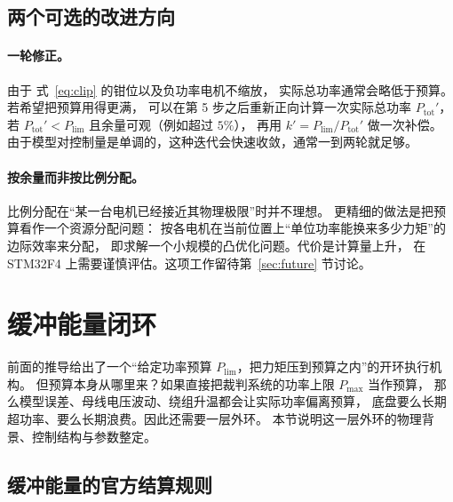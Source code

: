 \documentclass[cn,blue,11pt,device=normal]{elegantnote}
\newcommand{\Plim}{P_{\mathrm{lim}}{}}
\newcommand{\Pmax}{P_{\max}{}}
\newcommand{\fref}[1]{式~\eqref{#1}}
\begin{document}
\subsection{两个可选的改进方向}

\paragraph{一轮修正。}
由于 \fref{eq:clip} 的钳位以及负功率电机不缩放，
实际总功率通常会略低于预算。若希望把预算用得更满，
可以在第 5 步之后重新正向计算一次实际总功率 $P_{\mathrm{tot}}'$，
若 $P_{\mathrm{tot}}' < \Plim$ 且余量可观（例如超过 $5\%$），
再用 $k' = \Plim/P_{\mathrm{tot}}'$ 做一次补偿。
由于模型对控制量是单调的，这种迭代会快速收敛，通常一到两轮就足够。

\paragraph{按余量而非按比例分配。}
比例分配在“某一台电机已经接近其物理极限”时并不理想。
更精细的做法是把预算看作一个资源分配问题：
按各电机在当前位置上“单位功率能换来多少力矩”的边际效率来分配，
即求解一个小规模的凸优化问题。代价是计算量上升，
在 STM32F4 上需要谨慎评估。这项工作留待第~\ref{sec:future} 节讨论。

\section{缓冲能量闭环}\label{sec:bufferloop}

前面的推导给出了一个“给定功率预算 $\Plim$，把力矩压到预算之内”的开环执行机构。
但预算本身从哪里来？如果直接把裁判系统的功率上限 $\Pmax$ 当作预算，
那么模型误差、母线电压波动、绕组升温都会让实际功率偏离预算，
底盘要么长期超功率、要么长期浪费。因此还需要一层外环。
本节说明这一层外环的物理背景、控制结构与参数整定。

\subsection{缓冲能量的官方结算规则}
\end{document}
